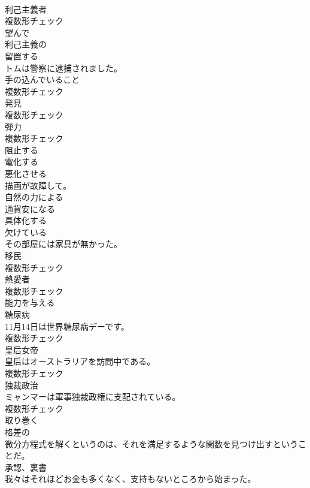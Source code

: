 \documentclass[8pt]{extreport}
\begin{document}
\begin{CJK}{UTF8}{min}
\\	[名詞]	利己主義者	
\\	複数形チェック
\\	[形容詞]	望んで	
\\	[形容詞]	利己主義の	
\\	[動詞]	留置する	
\\	トムは警察に逮捕されました。	
\\	[名詞]	手の込んでいること	
\\	複数形チェック
\\	[名詞]	発見	
\\	複数形チェック
\\	[名詞]	弾力	
\\	複数形チェック
\\	[動詞]	阻止する	
\\	[動詞]	電化する	
\\	[動詞]	悪化させる	
\\	描画が故障して。	
\\	[形容詞]	自然の力による	
\\	[動詞]	通貨安になる	
\\	[動詞]	具体化する	
\\	[形容詞]	欠けている	
\\	その部屋には家具が無かった。	
\\	[名詞]	移⺠	
\\	複数形チェック
\\	[名詞]	熱愛者	
\\	複数形チェック
\\	[動詞]	能力を与える	
\\	[名詞]	糖尿病	
\\	11月14日は世界糖尿病デーです。	
\\	複数形チェック
\\	[名詞]	皇后女帝	
\\	皇后はオーストラリアを訪問中である。	
\\	複数形チェック
\\	[名詞]	独裁政治	
\\	ミャンマーは軍事独裁政権に支配されている。	
\\	複数形チェック
\\	[動詞]	取り巻く	
\\	[形容詞]	格差の	
\\	微分方程式を解くというのは、それを満足するような関数を見つけ出すということだ。	
\\	[名詞]	承認、裏書	
\\	我々はそれほどお金も多くなく、支持もないところから始まった。	

\end{CJK}
\end{document}
